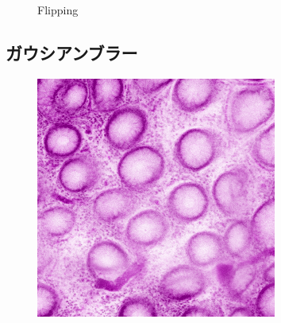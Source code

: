 \begin{figure}[H]
	\caption{Flipping}
	\label{fig:反転}
	
\end{figure}

\subsection*{ガウシアンブラー}

\begin{figure}[H]
	\centering
	
	\begin{minipage}{0.24\columnwidth}
		\centering
		\includegraphics[clip, width=\linewidth]{fig/preprocessing/data_aug/color/blur/blur_0_00}
	\end{minipage}
	\begin{minipage}{0.24\columnwidth}
		\centering

\end{minipage}
\end{figure}
